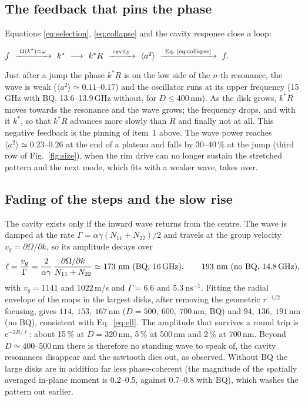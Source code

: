 \documentclass[11pt,a4paper]{article}
\newcommand{\ee}{\mathrm{e}}
\begin{document}
\subsection{The feedback that pins the phase}
Equations \eqref{eq:selection}, \eqref{eq:collapse} and the cavity response close a loop:
\begin{center}
$f\ \xrightarrow{\ \Omega(k^\ast)=\omega\ }\ k^\ast\ \longrightarrow\ k^\ast R\ \xrightarrow{\ \text{cavity}\ }\
\langle a^2\rangle\ \xrightarrow{\ \text{Eq.~\eqref{eq:collapse}}\ }\ f .$
\end{center}
Just after a jump the phase $k^\ast R$ is on the low side of the $n$-th resonance, the wave is weak
($\langle a^2\rangle\simeq0.11$--$0.17$) and the oscillator runs at its upper frequency (15\,GHz with BQ,
13.6--13.9\,GHz without, for $D\le400$\,nm).  As the disk grows, $k^\ast R$ moves towards the resonance and the
wave grows; the frequency drops, and with it $k^\ast$, so that $k^\ast R$ advances more slowly than $R$ and finally
not at all.  This negative feedback is the pinning of item~1 above.  The wave power reaches
$\langle a^2\rangle\simeq0.23$--$0.26$ at the end of a plateau and falls by 30--40\,\% at the jump (third row of
Fig.~\ref{fig:size}), when the rim drive can no longer sustain the stretched pattern and the next mode, which
fits with a weaker wave, takes over.

\subsection{Fading of the steps and the slow rise}
The cavity exists only if the inward wave returns from the centre.  The wave is damped at the rate
$\Gamma=\alpha\gamma(N_{11}+N_{22})/2$ and travels at the group velocity $v_g=\partial\Omega/\partial k$, so its
amplitude decays over
\begin{equation}
\ell=\frac{v_g}{\Gamma}=\frac{2}{\alpha\gamma}\,\frac{\partial\Omega/\partial k}{N_{11}+N_{22}}
\simeq173\ \mathrm{nm}\ \text{(BQ, 16\,GHz)},\qquad 193\ \mathrm{nm}\ \text{(no BQ, 14.8\,GHz)},
\label{eq:ell}
\end{equation}
with $v_g=1141$ and $1022$\,m/s and $\Gamma=6.6$ and $5.3\ \mathrm{ns}^{-1}$.  Fitting the radial envelope of the
maps in the largest disks, after removing the geometric $r^{-1/2}$ focusing, gives $114,\ 153,\ 167$\,nm
($D=500,\ 600,\ 700$\,nm, BQ) and $94,\ 136,\ 191$\,nm (no BQ), consistent with Eq.~\eqref{eq:ell}.
The amplitude that survives a round trip is $\ee^{-2R/\ell}$: about 15\,\% at $D=320$\,nm, 5\,\% at 500\,nm and
2\,\% at 700\,nm.  Beyond $D\simeq400$--$500$\,nm there is therefore no standing wave to speak of, the cavity
resonances disappear and the sawtooth dies out, as observed.  Without BQ the large disks are in addition far less
phase-coherent (the magnitude of the spatially averaged in-plane moment is 0.2--0.5, against 0.7--0.8 with BQ),
which washes the pattern out earlier.
\end{document}
